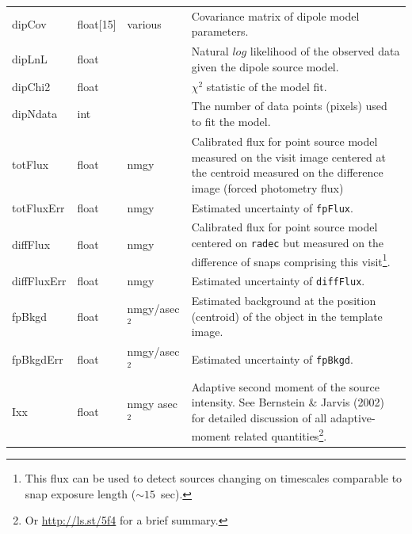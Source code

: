 \documentclass[12pt]{article}
\begin{document}
\begin{center}
\begin{longtable}{p{3cm}p{2cm}p{2cm}p{5cm}}
dipCov & float[15] & various & Covariance matrix of dipole model parameters. \\

dipLnL & float & ~ & Natural $log$ likelihood of the observed data given the dipole source model. \\

dipChi2 & float & ~ & $\chi^2$ statistic of the model fit. \\

dipNdata & int & ~ & The number of data points (pixels) used to fit the model. \\

totFlux & float & nmgy & Calibrated flux for point source model measured on the visit image centered at the centroid measured on the difference image (forced photometry flux) \\

totFluxErr & float & nmgy & Estimated uncertainty of \texttt{fpFlux}. \\

diffFlux & float & nmgy & Calibrated flux for point source model centered on {\tt radec} but measured on the difference of snaps comprising this visit\footnote{This flux can be used to detect sources changing on timescales comparable to snap exposure length ($\sim 15$~sec).}. \\

diffFluxErr & float & nmgy & Estimated uncertainty of \texttt{diffFlux}. \\

fpBkgd & float & nmgy/asec$^{2}$ & Estimated background at the position (centroid) of the object in
the template image. \\

fpBkgdErr & float & nmgy/asec$^{2}$ & Estimated uncertainty of \texttt{fpBkgd}. \\



Ixx & float & nmgy asec$^{2}$  & Adaptive second moment of the source intensity. See Bernstein \& Jarvis (2002) for detailed discussion of all adaptive-moment related quantities\footnote{Or \url{http://ls.st/5f4} for a brief summary.}. \\


\end{longtable}
\end{center}
\end{document}
